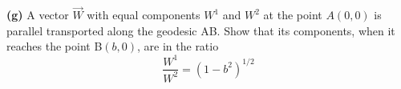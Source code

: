 \documentclass[a4paper]{article} %
\begin{document}
\pagebreak %

\begin{framed}
\textbf{(g)} A vector $\vec{W}$ with equal components $W^1$ and $W^2$ at the point $A(0,0)$ is parallel transported along the geodesic AB. Show that its components, when it reaches the point B$(b,0)$, are in the ratio
\begin{equation}
\frac{W^1}{W^2}=(1-b^2)^{1/2}
\end{equation}
\end{framed}
\end{document}
